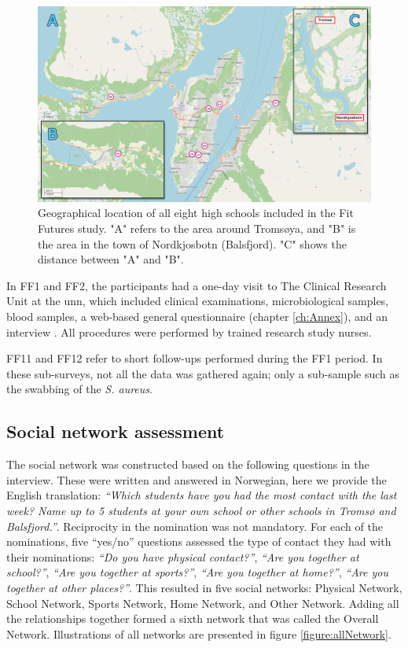     \begin{figure}[ht]
        \centering
            \includegraphics[width=0.9\linewidth]{figures/Methodology/schoolmaps.png } 
        \caption{Geographical location of all eight high schools included in the Fit Futures study. "A" refers to the area around Tromsøya, and "B" is the area in the town of Nordkjosbotn (Balsfjord). "C" shows the distance between "A" and "B".}
        \label{figure:hsLocations}
    \end{figure}

In FF1 and FF2, the participants had a one-day visit to The Clinical Research Unit at the \gls{unn}, which included clinical examinations, microbiological samples, blood samples, a web-based general questionnaire (chapter \ref{ch:Annex}), and an interview \cite{Winther2014}. All procedures were performed by trained research study nurses. 

FF11 and FF12 refer to short follow-ups performed during the FF1 period. In these sub-surveys, not all the data was gathered again; only a sub-sample such as the swabbing of the \textit{S. aureus}.

\subsection{Social network assessment}
\label{method:SocialNetwork}

The social network was constructed based on the following questions in the interview. These were written and answered in Norwegian, here we provide the English translation: \textit{“Which students have you had the most contact with the last week? Name up to 5 students at your own school or other schools in Tromsø and Balsfjord.”}. Reciprocity in the nomination was not mandatory. For each of the nominations, five “yes/no” questions assessed the type of contact they had with their nominations: \textit{“Do you have physical contact?”}, \textit{“Are you together at school?”}, \textit{“Are you together at sports?”}, \textit{“Are you together at home?”}, \textit{“Are you together at other places?”}. This resulted in five social networks: Physical Network, School Network, Sports Network, Home Network, and Other Network. Adding all the relationships together formed a sixth network that was called the Overall Network. Illustrations of all networks are presented in figure \ref{figure:allNetwork}.

